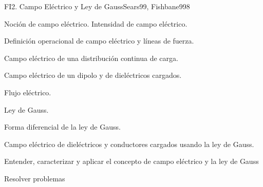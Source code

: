 \begin{syllabus}
\begin{unit}{FI2. Campo Eléctrico y Ley de Gauss}{Sears99, Fishbane99}{8}
   \begin{topics}
         \item  Noción de campo eléctrico.  Intensidad de campo eléctrico.
	 \item  Definición operacional de campo eléctrico y líneas de fuerza.
         \item  Campo eléctrico de una distribución continua de carga.
	 \item  Campo eléctrico de un dipolo y de dieléctricos cargados.
         \item  Flujo eléctrico.
	 \item  Ley de Gauss.
         \item  Forma diferencial de la ley de Gauss.
	 \item  Campo eléctrico de dieléctricos y conductores cargados usando la ley de Gauss.
   \end{topics}

   \begin{learningoutcomes}
         \item  Entender, caracterizar y aplicar el concepto de campo eléctrico y la ley de Gauss
         \item  Resolver problemas
   \end{learningoutcomes}
\end{unit}


\end{syllabus}
